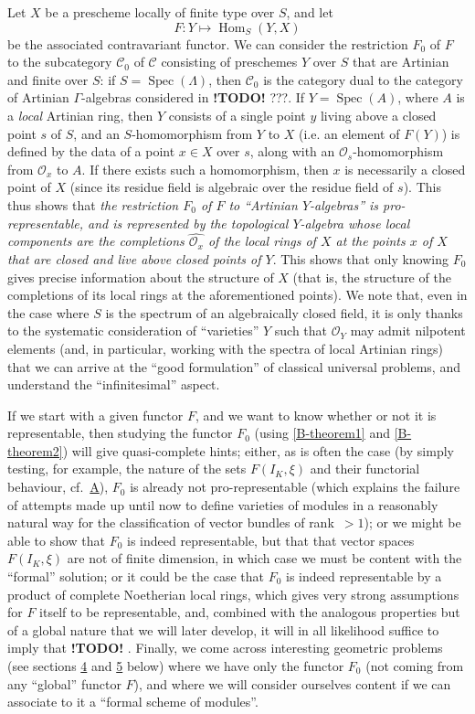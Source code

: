 \documentclass{article}
\theoremstyle{plain}
\theoremstyle{definition}
\newcommand{\sh}[1]{{\mathscr{#1}}}
\newcommand{\cat}[1]{{\mathcal{#1}}}
\DeclareMathOperator{\Hom}{Hom}
\DeclareMathOperator{\Spec}{Spec}
\newcommand{\todo}{\textbf{ !TODO! }}
\newcommand{\oldpage}[1]{\marginpar{\footnotesize$\Big\vert$ \textit{p.~#1}}}
\begin{document}
Let $X$ be a prescheme locally of finite type over $S$, and let
\[
  F\colon Y \mapsto \Hom_S(Y,X)
\]
be the associated contravariant functor.
We can consider the restriction $F_0$ of $F$ to the subcategory $\cat{C}_0$ of $\cat{C}$ consisting of preschemes $Y$ over $S$ that are Artinian and finite over $S$:
if $S=\Spec(\Lambda)$, then $\cat{C}_0$ is the category dual to the category of Artinian $\Gamma$-algebras considered in \todo{???}.
If $Y=\Spec(A)$, where $A$ is a \emph{local} Artinian ring, then $Y$ consists of a single point $y$ living above a closed point $s$ of $S$, and an $S$-homomorphism from $Y$ to $X$ (i.e. an element of $F(Y)$) is defined by the data of a point $x\in X$ over $s$, along with an $\sh{O}_s$-homomorphism from $\sh{O}_x$ to $A$.
If there exists such a homomorphism, then $x$ is necessarily a closed point of $X$ (since its residue field is algebraic over the residue field of $s$).
This thus shows that \emph{the restriction $F_0$ of $F$ to ``Artinian $Y$-algebras'' is pro-representable, and is represented by the topological $Y$-algebra whose local components are the completions $\widehat{\sh{O}_x}$ of the local rings of $X$ at the points $x$ of $X$ that are closed and live above closed points of $Y$}.
This shows that only knowing $F_0$ gives precise information about the structure of $X$ (that is, the structure of the completions of its local rings at the aforementioned points).
We note that, even in the case where $S$
\oldpage{195-12}
is the spectrum of an algebraically closed field, it is only thanks to the systematic consideration of ``varieties'' $Y$ such that $\sh{O}_Y$ may admit nilpotent elements (and, in particular, working with the spectra of local Artinian rings) that we can arrive at the ``good formulation'' of classical universal problems, and understand the ``infinitesimal'' aspect.

If we start with a given functor $F$, and we want to know whether or not it is representable, then studying the functor $F_0$ (using \cref{B-theorem1} and \cref{B-theorem2}) will give quasi-complete hints;
either, as is often the case (by simply testing, for example, the nature of the sets $F(I_K,\xi)$ and their functorial behaviour, cf.~\hyperref[A]{A}), $F_0$ is already not pro-representable (which explains the failure of attempts made up until now to define varieties of modules in a reasonably natural way for the classification of vector bundles of rank~$>1$);
or we might be able to show that $F_0$ is indeed representable, but that that vector spaces $F(I_K,\xi)$ are not of finite dimension, in which case we must be content with the ``formal'' solution;
or it could be the case that $F_0$ is indeed representable by a product of complete Noetherian local rings, which gives very strong assumptions for $F$ itself to be representable, and, combined with the analogous properties but of a global nature that we will later develop, it will in all likelihood suffice to imply that \todo.
Finally, we come across interesting geometric problems (see sections \hyperref[C.4]{4} and \hyperref[C.5]{5} below) where we have only the functor $F_0$ (not coming from any ``global'' functor $F$), and where we will consider ourselves content if we can associate to it a ``formal scheme of modules''.
\end{document}
